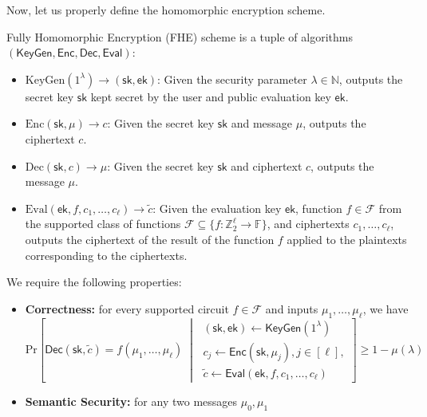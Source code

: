 \documentclass{iacrtrans}
\begin{document}
Now, let us properly define the homomorphic encryption scheme.
\begin{definition}
    Fully Homomorphic Encryption (FHE) scheme is a tuple of algorithms
    $(\mathsf{KeyGen}, \mathsf{Enc}, \mathsf{Dec}, \mathsf{Eval})$:
    \begin{itemize}
        \item $\mathrm{KeyGen}(1^{\lambda}) \to (\mathsf{sk},\mathsf{ek})$: Given the 
        security parameter $\lambda \in \mathbb{N}$, outputs the secret key $\mathsf{sk}$
        kept secret by the user and public evaluation key $\mathsf{ek}$.
        \item $\mathrm{Enc}(\mathsf{sk},\mu) \to c$: Given the secret key $\mathsf{sk}$
        and message $\mu$, outputs the ciphertext $c$.
        \item $\mathrm{Dec}(\mathsf{sk},c) \to \mu$: Given the secret key
        $\mathsf{sk}$ and ciphertext $c$, outputs the message $\mu$.
        \item $\mathrm{Eval}(\mathsf{ek},f,c_1,\ldots,c_{\ell}) \to
        \widetilde{c}$: Given the evaluation key $\mathsf{ek}$, function $f \in
        \mathcal{F}$ from the supported class of functions $\mathcal{F}
        \subseteq \{f: \mathbb{Z}^{\ell}_2 \to \mathbb{F}\}$, and ciphertexts
        $c_1,\ldots,c_{\ell}$, outputs the ciphertext of the result of the
        function $f$ applied to the plaintexts corresponding to the ciphertexts.
    \end{itemize}
    We require the following properties:
    \begin{itemize}
        \item \textbf{Correctness:} for every supported circuit $f \in \mathcal{F}$ and 
        inputs $\mu_1,\dots,\mu_{\ell}$, we have
        \begin{equation*}
            \text{Pr}\left[ \mathsf{Dec}(\mathsf{sk},\widetilde{c}) = f(\mu_1,\dots,\mu_{\ell}) \; \middle| \; \begin{matrix}
                (\mathsf{sk},\mathsf{ek}) \gets \mathsf{KeyGen}(1^{\lambda}) \\
                c_j \gets \mathsf{Enc}(\mathsf{sk},\mu_j), j \in [\ell], \\
                \widetilde{c} \gets \mathsf{Eval}(\mathsf{ek},f,c_1,\dots,c_{\ell})
            \end{matrix} \right] \geq 1 - \mu(\lambda)
        \end{equation*}
        \item \textbf{Semantic Security:} for any two messages $\mu_0,\mu_1$

\end{itemize}
\end{definition}
\end{document}
